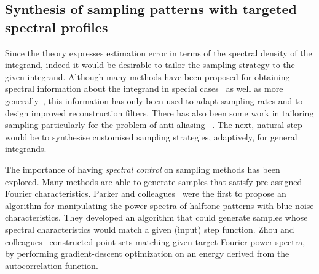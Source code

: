 \documentclass[11pt,fleqn]{book} %
\begin{document}
\subsection{Synthesis of sampling patterns with targeted spectral profiles}
Since the theory expresses estimation error in terms of the spectral density of the integrand, indeed it would be desirable to tailor the sampling strategy to the given integrand. Although many methods have been proposed for obtaining spectral information about the integrand in special cases~\cite{Egan:2009,Soler:2009,Ramamoorthi:2012,bagher:2013} as well as more generally~\cite{Durand:2005,Cov5D}, this information has only been used to adapt sampling rates and to design improved reconstruction filters. There has also been some work in tailoring sampling particularly for the problem of anti-aliasing ~\cite{Ahmed:2015:APP,Heck:2013:BNS}. The next, natural step would be to synthesise customised sampling strategies, adaptively, for general integrands. 

The importance of having \emph{spectral control} on sampling methods has been explored.  Many methods are  able to generate samples that satisfy pre-assigned Fourier characteristics. Parker and colleagues~\cite{parker1991new} were the first to propose an algorithm for manipulating the power spectra of halftone patterns with blue-noise characteristics. They developed an algorithm that could generate samples whose spectral characteristics would match a given (input) step function. Zhou and colleagues~\cite{Zhou:2012} constructed point sets matching given target Fourier power spectra, by performing  gradient-descent optimization on an energy derived from the autocorrelation function. 
\end{document}
